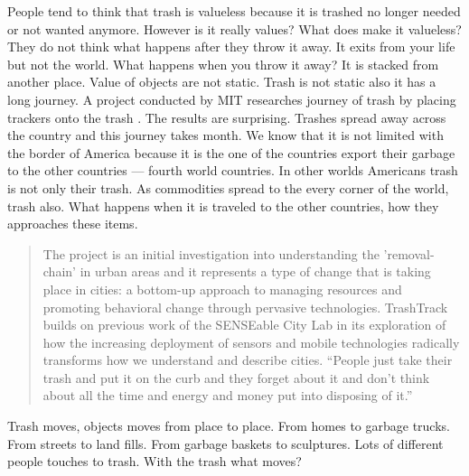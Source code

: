 People tend to think that trash is valueless because it is trashed no longer needed or not wanted anymore. However is it really values? What does make it valueless? They do not think what happens after they throw it away. It exits from your life but not the world. What happens when you throw it away? It is stacked from another place. Value of objects are not static. Trash is not static  also it has a long journey. A project conducted by MIT researches journey of trash by placing trackers onto the trash \cite{chen2009mit}. The results are surprising. Trashes spread away across the country and this journey takes month.  We know that it is not limited with the border of America because it is the one of the countries export their garbage to the other countries --- fourth world countries. In other worlds Americans trash is not only their trash. As commodities spread to the every corner of the world, trash also. What happens when it is traveled to the other countries, how they approaches these items.  

\begin{quote}
 The project is an initial investigation into understanding the 'removal-chain' in urban areas and it represents a type of change that is taking place in cities: a bottom-up approach to managing resources and promoting behavioral change through pervasive technologies. TrashTrack builds on previous work of the SENSEable City Lab in its exploration of how the increasing deployment of sensors and mobile technologies radically transforms how we understand and describe cities. “People just take their trash and put it on the curb and they forget about it and don’t think about all the time and energy and money put into disposing of it.”
\end{quote}

Trash moves, objects moves from place to place. From homes to garbage trucks. From streets to land fills. From garbage baskets to sculptures.  Lots of different people touches to trash. With the trash what moves?

